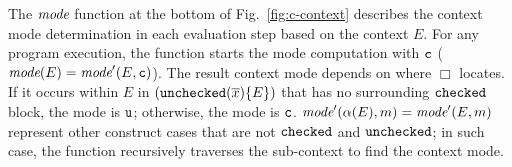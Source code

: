 The $\textit{mode}$ function  at the bottom of Fig.~\ref{fig:c-context}
describes the context mode determination in each evaluation step based on the context $E$.
For any program execution, the function starts the mode computation with $\texttt{c}$ ($\textit{mode}(E)=\textit{mode}'(E,\texttt{c})$).
The result context mode depends on where $\Box$ locates.
If it occurs within $E$ in $(\mathtt{unchecked}({\overline{x}})\{E\})$
that has no surrounding $\mathtt{checked}$ block,
the mode is $\texttt{u}$; otherwise, the mode is $\texttt{c}$.
$\textit{mode}'(\alpha({E}),m)=\textit{mode}'(E,m)$ represent other construct cases 
that are not $\mathtt{checked}$ and $\mathtt{unchecked}$; in such case, 
the function recursively traverses the sub-context to find the context mode.



